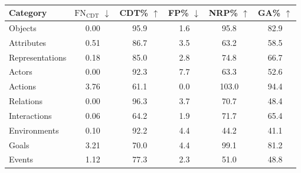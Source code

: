 \begin{table}[htbp]
\centering
\footnotesize
\begin{tabular}{l c c c c c}
\toprule
\textbf{Category} & $\text{FN}_\text{CDT}$ $\downarrow$ & CDT\% $\uparrow$ & FP\% $\downarrow$ & NRP\% $\uparrow$ & GA\% $\uparrow$ \\
\midrule
Objects        & 0.00 & 95.9 & 1.6 & 95.8  & 82.9 \\
Attributes     & 0.51 & 86.7 & 3.5 & 63.2  & 58.5 \\
Representations & 0.18 & 85.0 & 2.8 & 74.8  & 66.7 \\
Actors         & 0.00 & 92.3 & 7.7 & 63.3  & 52.6 \\
Actions        & 3.76 & 61.1 & 0.0 & 103.0 & 94.4 \\
Relations      & 0.00 & 96.3 & 3.7 & 70.7  & 48.4 \\
Interactions   & 0.06 & 64.2 & 1.9 & 71.7  & 65.4 \\
Environments   & 0.10 & 92.2 & 4.4 & 44.2  & 41.1 \\
Goals          & 3.21 & 70.0 & 4.4 & 99.1  & 81.2 \\
Events         & 1.12 & 77.3 & 2.3 & 51.0  & 48.8 \\
\bottomrule
\end{tabular}
\caption{}
\label{tab:base_metrics}
\end{table}
